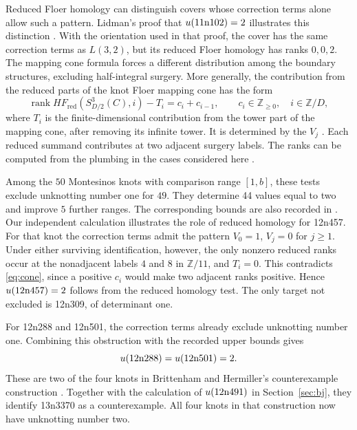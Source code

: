 \documentclass[12pt, oneside]{amsart}
\newcommand{\bbz}{{\mathbb Z}}
\newcommand{\kn}[2]{\textup{#1#2}}
\newcommand{\nUtwoM}{44}
\begin{document}
Reduced Floer homology can distinguish covers whose correction terms alone allow such a
pattern. Lidman's proof that $u(\kn{11n}{102})=2$ illustrates this distinction
\cite{Lidman}. With the orientation used in that proof, the cover has the same correction
terms as $L(3,2)$, but its reduced Floer
homology has ranks $0,0,2$. The mapping cone formula forces a different distribution
among the boundary structures, excluding half-integral surgery. More generally, the
contribution from the reduced parts of the knot Floer mapping cone has the form
\begin{equation}\label{eq:cone}
    \operatorname{rank}HF_{\mathrm{red}}(S^3_{D/2}(C),i)-T_i
       =c_i+c_{i-1},\qquad c_i\in\bbz_{\ge0},\quad i\in\bbz/D,
\end{equation}
where $T_i$ is the finite-dimensional contribution from the tower part of the mapping
cone, after removing its infinite tower. It is determined by the $V_j$
\cite[Cor.~14, Prop.~15]{Gainullin}. Each reduced summand contributes at two adjacent
surgery labels. The ranks can be computed from the plumbing in the cases considered
here \cite{Nemethi}.

Among the $50$ Montesinos knots with comparison range $[1,b]$, these tests exclude
unknotting number one for $49$. They determine \nUtwoM{} values equal to two and improve
$5$ further ranges. The corresponding bounds are also recorded in \cite{DGKTdata}. Our independent
calculation illustrates the role of reduced homology for \kn{12n}{457}. For that knot the correction terms admit the
pattern $V_0=1$, $V_j=0$ for $j\ge1$. Under either surviving identification, however,
the only nonzero reduced ranks occur at the nonadjacent labels $4$ and $8$ in
$\bbz/11$, and $T_i=0$. This contradicts \eqref{eq:cone}, since a positive $c_i$
would make two adjacent ranks positive. Hence $u(\kn{12n}{457})=2$ follows from the
reduced homology test. The only target not excluded is \kn{12n}{309}, of determinant one.

For \kn{12n}{288} and \kn{12n}{501}, the correction terms already exclude unknotting
number one. Combining this obstruction with the recorded upper bounds gives
\[
    u(\kn{12n}{288})=u(\kn{12n}{501})=2.
\]
These are two of the four knots in Brittenham and Hermiller's counterexample
construction \cite[Thm.~1.3]{BH1705}. Together with the calculation of
$u(\kn{12n}{491})$ in Section~\ref{sec:bj}, they identify \kn{13n}{3370} as a
counterexample. All four knots in that construction now have unknotting number two.

\raggedbottom
\end{document}
